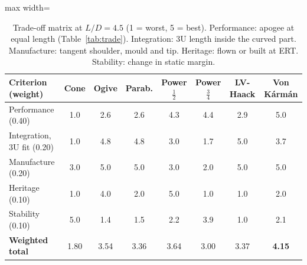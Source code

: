 \begin{table}[H]
\centering
\caption{Trade-off matrix at $L/D = 4.5$ (1 = worst, 5 = best). Performance: apogee at equal length (Table~\ref{tab:trade}). Integration: 3U length inside the curved part. Manufacture: tangent shoulder, mould and tip. Heritage: flown or built at ERT. Stability: change in static margin.}
\label{tab:matrix}
\small
\begin{adjustbox}{max width=\textwidth}
\begin{tabular}{@{}lccccccc@{}}
\toprule
Criterion (weight) & Cone & Ogive & Parab. & Power $\tfrac12$ & Power $\tfrac34$ & LV-Haack & Von K\'arm\'an \\
\midrule
Performance (0.40) & 1.0 & 2.6 & 2.6 & 4.3 & 4.4 & 2.9 & 5.0 \\
Integration, 3U fit (0.20) & 1.0 & 4.8 & 4.8 & 3.0 & 1.7 & 5.0 & 3.7 \\
Manufacture (0.20) & 3.0 & 5.0 & 5.0 & 3.0 & 2.0 & 5.0 & 5.0 \\
Heritage (0.10) & 1.0 & 4.0 & 2.0 & 5.0 & 1.0 & 1.0 & 2.0 \\
Stability (0.10) & 5.0 & 1.4 & 1.5 & 2.2 & 3.9 & 1.0 & 2.1 \\
\midrule
\textbf{Weighted total} & 1.80 & 3.54 & 3.36 & 3.64 & 3.00 & 3.37 & \textbf{4.15} \\
\bottomrule
\end{tabular}
\end{adjustbox}
\end{table}
